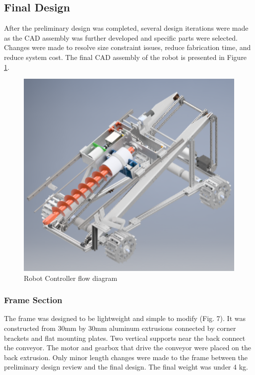 \documentclass[class=article, crop=false]{standalone}
\begin{document}
	\subsection{Final Design}
	\label{subsec:final-design}
	
	After the preliminary design was completed, several design iterations were made as the CAD assembly was further developed and specific parts were selected. Changes were made to resolve size constraint issues, reduce fabrication time, and reduce system cost. The final CAD assembly of the robot is presented in Figure \ref{fig:final-cad}.
	
	\FloatBarrier
	\begin{figure}[h]
	\centering
	 \includegraphics[width=0.6\linewidth]{09_Figures/final-cad.jpg}
	 \caption{Robot Controller flow diagram}
	 \label{fig:final-cad}
	\end{figure}
	\FloatBarrier
	
	\subsubsection{Frame Section}
	
	The frame was designed to be lightweight and simple to modify (Fig. 7). It was constructed from 30mm by 30mm aluminum extrusions connected by corner brackets and flat mounting plates. Two vertical supports near the back connect the conveyor. The motor and gearbox that drive the conveyor were placed on the back extrusion. Only minor length changes were made to the frame between the preliminary design review and the final design. The final weight was under 4 kg.
	
\end{document}
